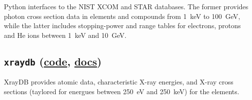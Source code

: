Python interfaces to the NIST XCOM and STAR databases. The former provides
photon cross section data in elements and compounds from 1~keV to 100~GeV, while
the latter includes stopping-power and range tables for electrons, protons and He ions
between 1~keV and 10~GeV.


\subsection{\texttt{xraydb} (\href{https://github.com/xraypy/XrayDB}{code},
  \href{https://xraypy.github.io/XrayDB/}{docs})}

XrayDB provides atomic data, characteristic X-ray energies, and X-ray cross sections
(taylored for energues between 250~eV and 250~keV) for the elements.




